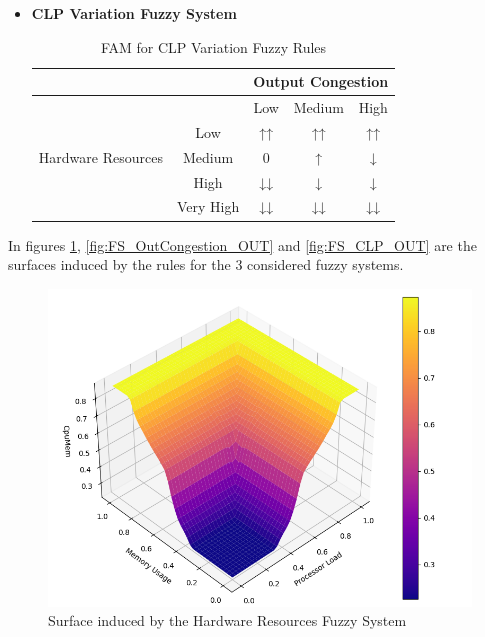 \begin{itemize}
    \item \textbf{CLP Variation Fuzzy System}
    \begin{table}[!htb]
        \begin{center}
            \begin{tabular}{ |c|c|c|c|c| }
                \hline
                & & \multicolumn{3}{c|}{Output Congestion} \\
                \hline
                \multirow{5}{6em}{Hardware Resources} 
                &             & Low   & Medium & High \\ 
                & Low         & ↑↑    & ↑↑     & ↑↑    \\ 
                & Medium      & 0     & ↑      & ↓    \\ 
                & High        & ↓↓    & ↓      & ↓    \\ 
                & Very High   & ↓↓    & ↓↓     & ↓↓   \\
                \hline
            \end{tabular}
            \caption{FAM for CLP Variation Fuzzy Rules}
            \label{tab:FAM_CLP}
        \end{center}
    \end{table}
\end{itemize}


In figures \ref{fig:FS_CpuMem_OUT}, \ref{fig:FS_OutCongestion_OUT} and \ref{fig:FS_CLP_OUT} are the surfaces induced by the rules for the 3 considered fuzzy systems.

\begin{figure}[!htb]
    \centering
    
    \includegraphics[width=.6\textwidth]{images/plots/CpuMem3D_better.png}\hfill

    \caption{Surface induced by the Hardware Resources Fuzzy System}
    \label{fig:FS_CpuMem_OUT}
\end{figure}

